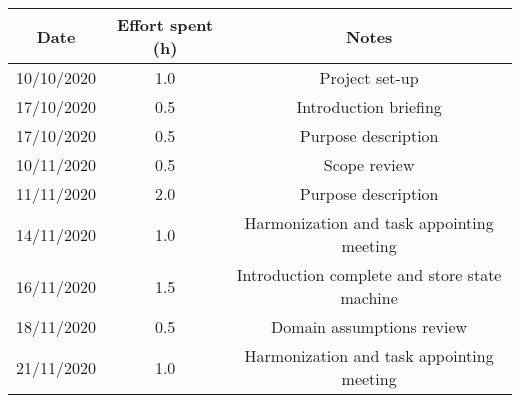 \documentclass[../../main.tex]{subfiles}
\begin{document}
    \begin{center}
        \begin{tabular}{|c| |c| |c|} 
            \hline
            Date & Effort spent (h) & Notes\\ [0.5ex] 
            \hline\hline
            10/10/2020 & 1.0 & Project set-up\\ 
            17/10/2020 & 0.5 & Introduction briefing\\ 
            17/10/2020 & 0.5 & Purpose description\\ 
            10/11/2020 & 0.5 & Scope review\\
            11/11/2020 & 2.0 & Purpose description\\
            14/11/2020 & 1.0 & Harmonization and task appointing meeting\\
            16/11/2020 & 1.5 & Introduction complete and store state machine\\
            18/11/2020 & 0.5 & Domain assumptions review\\
            21/11/2020 & 1.0 & Harmonization and task appointing meeting\\
            \hline
        \end{tabular}
    \end{center}
\end{document}

